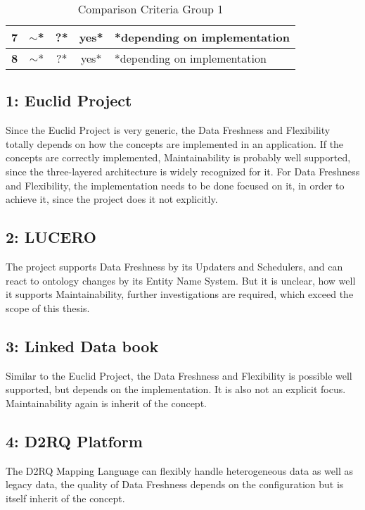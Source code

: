 \begin{table}[htbp]
{\begin{tabular}{|c|c|c|c|l|}
\textbf{7}  & $\sim$*                                                               & ?*                                                                   & yes*                                                              & *depending on implementation     \\ \hline
\textbf{8}  & $\sim$*                                                               & ?*                                                                   & yes*                                                              & *depending on implementation     \\ \hline
\end{tabular}
}
\caption{Comparison Criteria Group 1}
\label{tbl_comp_gr_1}
\end{table}

\subsection*{1: Euclid Project} 
Since the Euclid Project is very generic, the Data Freshness and Flexibility 
totally depends on how the concepts are implemented in an application. If the 
concepts are correctly implemented, Maintainability is probably well supported, 
since the three-layered architecture is widely recognized for it. For Data 
Freshness and Flexibility, the implementation needs to be done focused on it, in 
order to achieve it, since the project does it not explicitly.

\subsection*{2: LUCERO}
The project supports Data Freshness by its Updaters and Schedulers, and can react 
to ontology changes by its Entity Name System. But it is unclear, how well it 
supports Maintainability, further investigations are required, which exceed the 
scope of this thesis.

\subsection*{3: Linked Data book}
Similar to the Euclid Project, the Data Freshness and Flexibility is possible well 
supported, but depends on the implementation. It is also not an explicit focus. 
Maintainability again is inherit of the concept.

\subsection*{4: D2RQ Platform}
The D2RQ Mapping Language can flexibly handle heterogeneous data as well as legacy 
data, the quality of Data Freshness depends on the configuration but is itself 
inherit of the concept.

